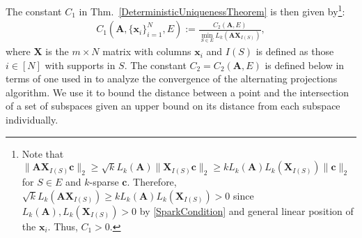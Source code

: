 \documentclass[9pt,twocolumn]{pnas-new}
\begin{document}
The constant $C_1$ in Thm.~\ref{DeterministicUniquenessTheorem} is then given by\footnote{Note that $\|\mathbf{AX}_{I(S)}\mathbf{c}\|_2 \geq \sqrt{k} L_k(\mathbf{A})\|\mathbf{X}_{I(S)}\mathbf{c}\|_2 \geq k L_k(\mathbf{A}) L_k(\mathbf{X}_{I(S)})\|\mathbf{c}\|_2$ for $S \in E$ and $k$-sparse $\mathbf{c}$. Therefore, $\sqrt{k} L_k(\mathbf{AX}_{I(S)}) \geq k L_k(\mathbf{A}) L_k(\mathbf{X}_{I(S)}) > 0$ since $L_k(\mathbf{A}), L_k(\mathbf{X}_{I(S)}) > 0$ by \eqref{SparkCondition} and general linear position of the $\mathbf{x}_i$.  Thus, $C_1 > 0$.  }:
\begin{align}\label{Cdef1}
C_1(\mathbf{A}, \{\mathbf{x}_i\}_{i=1}^N, E) := \frac{ C_2(\mathbf{A}, E) } { \min_{S \in E} L_k(\mathbf{AX}_{I(S)}) },
\end{align}
%
where $\mathbf{X}$ is the $m \times N$ matrix with columns $\mathbf{x}_i$ and $I(S)$ is defined as those $i \in [N]$ with supports in $S$. The constant $C_2 = C_2(\mathbf{A}, E)$ is defined below in terms of one used in \cite{Deutsch12} to analyze the convergence of the alternating projections algorithm.
We use it to bound the distance between a point and the intersection of a set of subspaces given an upper bound on its distance from each subspace individually.
\end{document}
